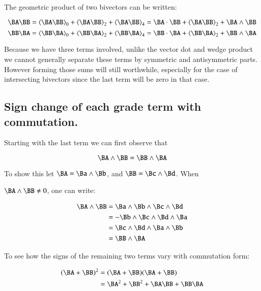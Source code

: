 The geometric product of two bivectors can be written:

\begin{equation}\label{eqn:bivector:ABprod}
\BA \BB = 
\gpgrade{\BA \BB}{0}
+\gpgrade{\BA \BB}{2}
+\gpgrade{\BA \BB}{4}
= 
{\BA \cdot \BB}
+\gpgrade{\BA \BB}{2}
+{\BA \wedge \BB}
\end{equation}
\begin{equation}\label{eqn:bivector:BAprod}
\BB \BA = 
\gpgrade{\BB \BA}{0}
+\gpgrade{\BB \BA}{2}
+\gpgrade{\BB \BA}{4}
= 
{\BB \cdot \BA}
+\gpgrade{\BB \BA}{2}
+{\BB \wedge \BA}
\end{equation}

Because we have three terms involved, unlike the vector dot and wedge product we cannot generally separate these terms by symmetric and antisymmetric parts.  However forming those sums will still worthwhile, especially for the case of intersecting bivectors since the last term will be zero in that case.

\subsection{Sign change of each grade term with commutation. }

Starting with the last term we can first observe that

\begin{equation}\label{eqn:bivector:wedgesign}
\BA \wedge \BB = \BB \wedge \BA
\end{equation}

To show this let $\BA = \Ba \wedge \Bb$, and $\BB = \Bc \wedge \Bd$.  When

$\BA \wedge \BB \ne 0$, one can write:

\begin{align*}
\BA \wedge \BB 
&= \Ba \wedge \Bb \wedge \Bc \wedge \Bd \\
&= - \Bb \wedge \Bc \wedge \Bd \wedge \Ba \\
&= \Bc \wedge \Bd \wedge \Ba \wedge \Bb \\
&= \BB \wedge \BA \\
\end{align*}

To see how the signs of the remaining two terms vary with commutation form:

\begin{align*}
(\BA + \BB)^2
&= (\BA + \BB)(\BA + \BB) \\
&= \BA^2 + \BB^2 + \BA \BB + \BB \BA \\
\end{align*}

